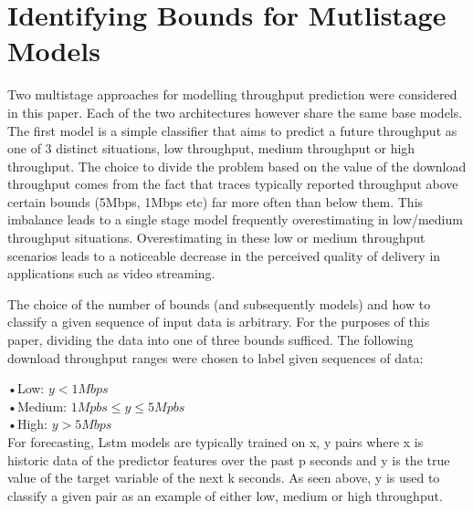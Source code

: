\section{Identifying Bounds for Mutlistage Models}
Two multistage approaches for modelling throughput prediction were considered in this paper. Each of the two architectures however share the same base models. The first model is a simple classifier that aims to predict a future throughput as one of 3 distinct situations, low throughput, medium throughput or high throughput. The choice to divide the problem based on the value of the download throughput comes from the fact that traces typically reported throughput above certain bounds (5Mbps, 1Mbps etc) far more often than below them. This imbalance leads to a single stage model frequently overestimating in low/medium throughput situations. Overestimating in these low or medium throughput scenarios leads to a noticeable decrease in the perceived quality of delivery in applications such as video streaming. 

The choice of the number of bounds (and subsequently models) and how to classify a given sequence of input data is arbitrary. For the purposes of this paper, dividing the data into one of three bounds sufficed. The following download throughput ranges were chosen to label given sequences of data:

•Low: $ y< 1Mbps$ \\
•Medium: $1Mpbs \leq y \leq 5Mpbs$ \\
•High: $y > 5Mbps$ \\

For forecasting, Lstm models are typically trained on x, y pairs where x is historic data of the predictor features over the past p seconds and y is the true value of the target variable of the next k seconds. As seen above, y is used to classify a given pair as an example of either low, medium or high throughput.